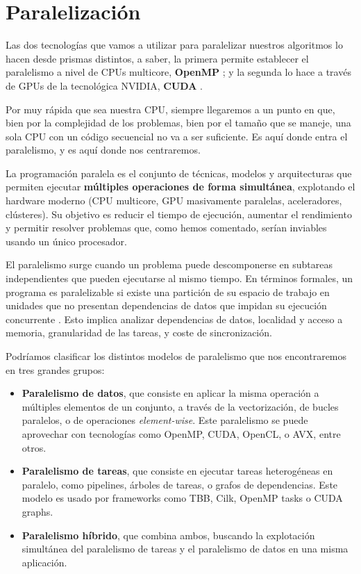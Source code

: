 \section{Paralelización}
Las dos tecnologías que vamos a utilizar para paralelizar nuestros algoritmos lo hacen desde prismas distintos, a saber, la primera permite establecer el paralelismo a nivel de CPUs multicore, \textbf{OpenMP} \cite{Jin2024};  y la segunda lo hace a través de GPUs de la tecnológica NVIDIA, \textbf{CUDA} \cite{Kirk2010}.

Por muy rápida que sea nuestra CPU, siempre llegaremos a un punto en que, bien por la complejidad de los problemas, bien por el tamaño que se maneje, una sola CPU con un código secuencial no va a ser suficiente. Es aquí donde entra el paralelismo, y es aquí donde nos centraremos.

La programación paralela es el conjunto de técnicas, modelos y arquitecturas que permiten ejecutar \textbf{múltiples operaciones de forma simultánea}, explotando el hardware moderno (CPU multicore, GPU masivamente paralelas, aceleradores, clústeres). Su objetivo es reducir el tiempo de ejecución, aumentar el rendimiento y permitir resolver problemas que, como hemos comentado, serían inviables usando un único procesador.

El paralelismo surge cuando un problema puede descomponerse en subtareas independientes que pueden ejecutarse al mismo tiempo. En términos formales, un programa es paralelizable si existe una partición de su espacio de trabajo en unidades que no presentan dependencias de datos que impidan su ejecución concurrente \cite{Wilkinson2005}. Esto implica analizar dependencias de datos, localidad y acceso a memoria, granularidad de las tareas, y coste de sincronización.

Podríamos clasificar los distintos modelos de paralelismo que nos encontraremos en tres grandes grupos: \cite{Grama2003}

\begin{itemize}
	\item \textbf{Paralelismo de datos}, que consiste en aplicar la misma operación a múltiples elementos de un conjunto, a través de la vectorización, de bucles paralelos, o de operaciones \textit{element-wise}. Este paralelismo se puede aprovechar con tecnologías como OpenMP, CUDA, OpenCL, o AVX, entre otros.
	\item \textbf{Paralelismo de tareas}, que consiste en ejecutar tareas heterogéneas en paralelo, como pipelines, árboles de tareas, o grafos de dependencias. Este modelo es usado por frameworks como TBB, Cilk, OpenMP tasks o CUDA graphs.
	\item \textbf{Paralelismo híbrido}, que combina ambos, buscando la explotación simultánea del paralelismo de tareas y el paralelismo de datos en una misma aplicación.
\end{itemize}

